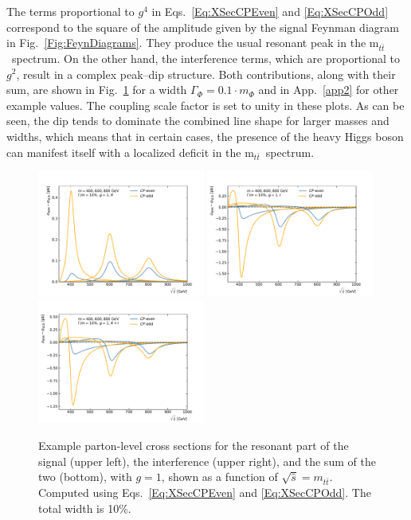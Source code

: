 The terms proportional to $g^4$ in Eqs.~\ref{Eq:XSecCPEven} and \ref{Eq:XSecCPOdd} correspond to the square of the amplitude given by the signal Feynman diagram in Fig.~\ref{Fig:FeynDiagrams}.
They produce the usual resonant peak in the m$_{t\bar t}$~spectrum.
On the other hand, the interference terms, which are proportional to $g^2$, result in a complex peak–dip structure.
Both contributions, along with their sum, are shown in Fig.~\ref{Fig:AnalyticXSec} for a width $\Gamma_\Phi = 0.1 \cdot m_\Phi$ and in App.~\ref{app2} for other example values.
The coupling scale factor is set to unity in these plots.
As can be seen, the dip tends to dominate the combined line shape for larger masses and widths, which means that in certain cases, the presence of the heavy Higgs boson can manifest itself with a localized deficit in the m$_{t\bar t}$~spectrum.

\begin{figure}
 \centering
 \includegraphics[width=0.49\textwidth]{fig/chapt4/gen_plots/analytical/xSec_relW10_R.pdf}
 \includegraphics[width=0.49\textwidth]{fig/chapt4/gen_plots/analytical/xSec_relW10_I.pdf} \\
 \includegraphics[width=0.49\textwidth]{fig/chapt4/gen_plots/analytical/xSec_relW10_Sum.pdf}
 \caption{Example parton-level cross sections for the resonant part of the signal (upper left), the interference (upper right), and the sum of the two (bottom), with $g = 1$, shown as a function of $\sqrt{\hat{s}} = m_{t\bar t}$. Computed using Eqs.~\ref{Eq:XSecCPEven} and \ref{Eq:XSecCPOdd}. The total width is 10\%.}
 \label{Fig:AnalyticXSec}
\end{figure}

